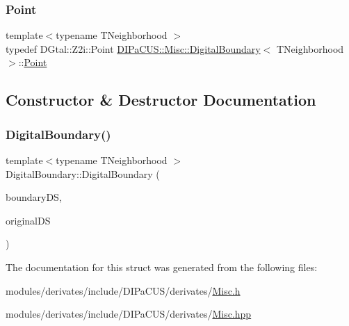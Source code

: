 \mbox{\label{structDIPaCUS_1_1Misc_1_1DigitalBoundary_a4434320a7be995d954820b08574eb33c}} 
\subsubsection{\texorpdfstring{Point}{Point}}
{\footnotesize\ttfamily template$<$typename T\+Neighborhood $>$ \\
typedef D\+Gtal\+::\+Z2i\+::\+Point \hyperlink{structDIPaCUS_1_1Misc_1_1DigitalBoundary}{D\+I\+Pa\+C\+U\+S\+::\+Misc\+::\+Digital\+Boundary}$<$ T\+Neighborhood $>$\+::\hyperlink{structDIPaCUS_1_1Misc_1_1DigitalBoundary_a4434320a7be995d954820b08574eb33c}{Point}}



\subsection{Constructor \& Destructor Documentation}
\mbox{\label{structDIPaCUS_1_1Misc_1_1DigitalBoundary_a1d4a4dcc4c7c471e09266ab1832f480d}} 
\subsubsection{\texorpdfstring{Digital\+Boundary()}{DigitalBoundary()}}
{\footnotesize\ttfamily template$<$typename T\+Neighborhood $>$ \\
Digital\+Boundary\+::\+Digital\+Boundary (\begin{DoxyParamCaption}\item[{\hyperlink{structDIPaCUS_1_1Misc_1_1DigitalBoundary_aedd7527b8021fdf88fcb01474bd77027}{Digital\+Set} \&}]{boundary\+DS,  }\item[{const \hyperlink{structDIPaCUS_1_1Misc_1_1DigitalBoundary_aedd7527b8021fdf88fcb01474bd77027}{Digital\+Set} \&}]{original\+DS }\end{DoxyParamCaption})}



The documentation for this struct was generated from the following files\+:\begin{DoxyCompactItemize}
\item 
modules/derivates/include/\+D\+I\+Pa\+C\+U\+S/derivates/\hyperlink{Misc_8h}{Misc.\+h}\item 
modules/derivates/include/\+D\+I\+Pa\+C\+U\+S/derivates/\hyperlink{Misc_8hpp}{Misc.\+hpp}\end{DoxyCompactItemize}
